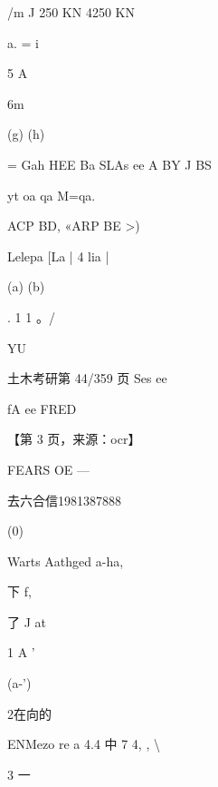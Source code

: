 \documentclass[UTF8,12pt,a4paper,openany]{ctexbook}
\begin{document}
\begin{enumerate}[label=\textbf{\arabic*.},leftmargin=2em]
/m J 250 KN 4250 KN\par a. =      i\par 5                A\par 6m\par (g)                           (h)\par = Gah HEE Ba SLAs ee A BY J BS\par yt          oa            qa   M=qa.\par ACP BD, «ARP BE >)\par Lelepa     [La | 4 lia |\par (a)                      (b)\par . 1 1 。/\par YU\par 土木考研第 44/359 页                           Ses ee\par fA ee FRED\par \par 【第 3 页，来源：ocr】\par FEARS OE     —\par 去六合信1981387888\par (0)\par Warts Aathged a-ha,\par 下         f,\par 了       J          at\par 1       A                                '\par (a-')\par 2在向的\par ENMezo re a 4.4  中 7  4, ,  \textbackslash{}\par 3    一           
\end{enumerate}
\end{document}
